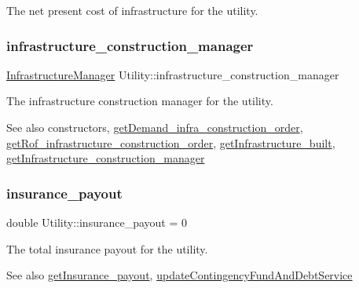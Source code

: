 The net present cost of infrastructure for the utility. 

\mbox{\label{classUtility_a2eff94831dd7a4b7a4243ef69c5311d9}} 
\subsubsection{\texorpdfstring{infrastructure\+\_\+construction\+\_\+manager}{infrastructure\_construction\_manager}}
{\footnotesize\ttfamily \mbox{\hyperlink{classInfrastructureManager}{Infrastructure\+Manager}} Utility\+::infrastructure\+\_\+construction\+\_\+manager\hspace{0.3cm}{\ttfamily [private]}}



The infrastructure construction manager for the utility. 

\begin{DoxySeeAlso}{See also}
constructors, \mbox{\hyperlink{classUtility_ab62d06b45773fb9e5574a339ac0c449e}{get\+Demand\+\_\+infra\+\_\+construction\+\_\+order}}, \mbox{\hyperlink{classUtility_a446e46d3dac749121db6cb839acf28dd}{get\+Rof\+\_\+infrastructure\+\_\+construction\+\_\+order}}, \mbox{\hyperlink{classUtility_abe05c15d0ea2efec00c00a8ee418b53b}{get\+Infrastructure\+\_\+built}}, \mbox{\hyperlink{classUtility_a0e8ecb5bbf910de9abecbef06c1662e6}{get\+Infrastructure\+\_\+construction\+\_\+manager}} 
\end{DoxySeeAlso}
\mbox{\label{classUtility_a833681a1110eca06030e8cca742708fb}} 
\subsubsection{\texorpdfstring{insurance\+\_\+payout}{insurance\_payout}}
{\footnotesize\ttfamily double Utility\+::insurance\+\_\+payout = 0\hspace{0.3cm}{\ttfamily [private]}}



The total insurance payout for the utility. 

\begin{DoxySeeAlso}{See also}
\mbox{\hyperlink{classUtility_af789e394a867f007b681c68af3fb3349}{get\+Insurance\+\_\+payout}}, \mbox{\hyperlink{classUtility_ab663efd526505a3d843cae7075cc3b91}{update\+Contingency\+Fund\+And\+Debt\+Service}} 
\end{DoxySeeAlso}
\mbox{\label{classUtility_a16b9ac7474fb956679a5a6be82efdf46}} 
